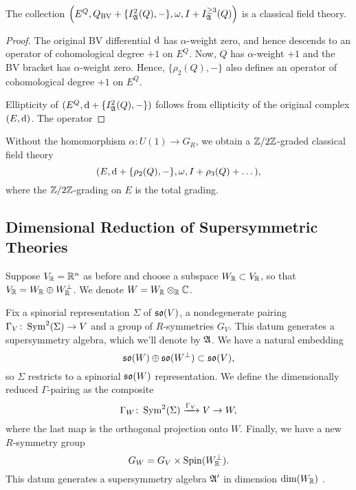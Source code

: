 \documentclass[10pt, oneside]{article}
\begin{document}
\begin{prop}
The collection $\left(E^Q, Q_{\mathrm{BV}} + \{I^2_{\mathfrak A} (Q), -\}, \omega, I + I^{\geq 3}_\mathfrak A (Q)\right)$ is a classical field theory.
\end{prop}

\begin{proof}
The original BV differential ${\rm d}$ has $\alpha$-weight zero, and hence descends to an operator of cohomological degree $+1$ on $E^Q$. 
Now, $Q$ has $\alpha$-weight $+1$ and the BV bracket has $\alpha$-weight zero. 
Hence, $\{\rho_{2}(Q), -\}$ also defines an operator of cohomological degree $+1$ on $E^Q$. 

Ellipticity of $(E^Q, {\rm d} + \{I_\mathfrak A^2 (Q), -\})$ follows from ellipticity of the original complex $(E, {\rm d})$.
The operator 
\end{proof}


\begin{remark}
Without the homomorphism $\alpha : U(1) \to G_R$, we obtain a $\mathbb Z/2\mathbb Z$-graded classical field theory
\[(E, {\rm d} + \{\rho_2(Q), -\}, \omega, I + \rho_3(Q) + \dots),\]
where the $\mathbb Z/2\mathbb Z$-grading on $E$ is the total grading.
\end{remark}

\subsection{Dimensional Reduction of Supersymmetric Theories}

Suppose $V_\mathbb R=\mathbb R^n$ as before and choose a subspace $W_\mathbb R\subset V_\mathbb R$, so that $V_\mathbb R = W_\mathbb R\oplus W^\perp_\mathbb R$. We denote $W=W_{\mathbb R}\otimes_{\mathbb R} \mathbb C$.

Fix a spinorial representation $\Sigma$ of $\mathfrak{so}(V)$, a nondegenerate pairing $\Gamma_V\colon \operatorname{Sym}^2(\Sigma)\rightarrow V$ and a group of $R$-symmetries $G_V$.  This datum generates a supersymmetry algebra, which we'll denote by $\mathfrak{A}$.  We have a natural embedding
\[\mathfrak{so}(W)\oplus \mathfrak{so}(W^{\perp})\subset \mathfrak{so}(V),\]
so $\Sigma$ restricts to a spinorial $\mathfrak{so}(W)$ representation. We define the dimensionally reduced $\Gamma$-pairing as the composite
\[\Gamma_W\colon \operatorname{Sym}^2(\Sigma)\xrightarrow{\Gamma_V} V\rightarrow W,\]
where the last map is the orthogonal projection onto $W$. Finally, we have a new $R$-symmetry group
\[G_W = G_V\times \mathrm{Spin}(W^\perp_\mathbb R).\]
This datum generates a supersymmetry algebra $\mathfrak{A}'$ in dimension $\mathrm{dim}(W_\mathbb R)$ .
\end{document}
